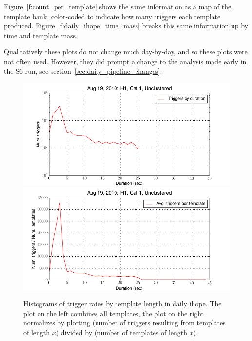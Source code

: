 Figure~\ref{f:count_per_template} shows the same information as a map
of the template bank, color-coded to indicate how many triggers each
template produced.  Figure~\ref{f:daily_ihope_time_mass} breaks this
same information up by time and template mass.

Qualitatively these plots do not change much day-by-day, and so these
plots were not often used.  However, they did prompt a change to
the analysis made early in the S6 run, see
section~\ref{sec:daily_pipeline_changes}.

\begin{figure}
  \includegraphics[width=0.5\linewidth]{figures/detchar/H1_1_UNCLUSTERED_mass_hist}
  \includegraphics[width=0.5\linewidth]{figures/detchar/H1_1_UNCLUSTERED_mass_hist_norm}
  \caption[Histograms of trigger rates by template length]{
  \label{f:daily_ihope_trig_histograms}
Histograms of trigger rates by template length in daily ihope.  The
plot on the left combines all templates, the plot on the right
normalizes by plotting (number of triggers resulting from templates of
length $x$) divided by (number of templates of length $x$).
}
\end{figure}%

